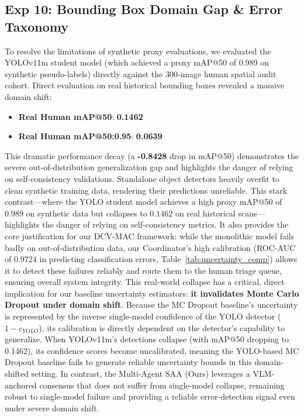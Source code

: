 \documentclass[11pt,a4paper]{article}
\newcommand{\term}[1]{\textbf{#1}}
\begin{document}
\subsection{Exp 10: Bounding Box Domain Gap \& Error Taxonomy}\label{sec:domain_gap}
To resolve the limitations of synthetic proxy evaluations, we evaluated the YOLOv11m student model (which achieved a proxy mAP@50 of 0.989 on synthetic pseudo-labels) directly against the 300-image human spatial audit cohort. Direct evaluation on real historical bounding boxes revealed a massive domain shift:
\begin{itemize}[noitemsep]
    \item \term{Real Human mAP@50}: \textbf{0.1462}
    \item \term{Real Human mAP@50:0.95}: \textbf{0.0639}
\end{itemize}
This dramatic performance decay (a \textbf{-0.8428} drop in mAP@50) demonstrates the severe out-of-distribution generalization gap and highlights the danger of relying on self-consistency validations. Standalone object detectors heavily overfit to clean synthetic training data, rendering their predictions unreliable. This stark contrast—where the YOLO student model achieves a high proxy mAP@50 of $0.989$ on synthetic data but collapses to $0.1462$ on real historical scans—highlights the danger of relying on self-consistency metrics. It also provides the core justification for our DCV-MAC framework: while the monolithic model fails badly on out-of-distribution data, our Coordinator's high calibration (ROC-AUC of $0.9724$ in predicting classification errors, Table~\ref{tab:uncertainty_comp}) allows it to detect these failures reliably and route them to the human triage queue, ensuring overall system integrity. This real-world collapse has a critical, direct implication for our baseline uncertainty estimators: \textbf{it invalidates Monte Carlo Dropout under domain shift}. Because the MC Dropout baseline's uncertainty is represented by the inverse single-model confidence of the YOLO detector ($1 - c_{YOLO}$), its calibration is directly dependent on the detector's capability to generalize. When YOLOv11m's detections collapse (with mAP@50 dropping to 0.1462), its confidence scores become uncalibrated, meaning the YOLO-based MC Dropout baseline fails to generate reliable uncertainty bounds in this domain-shifted setting. In contrast, the Multi-Agent SAA (Ours) leverages a VLM-anchored consensus that does not suffer from single-model collapse, remaining robust to single-model failure and providing a reliable error-detection signal even under severe domain shift.
\end{document}
